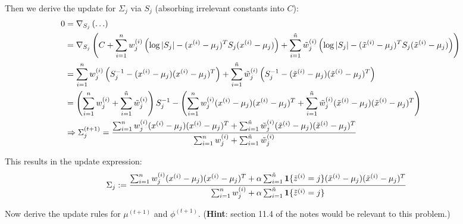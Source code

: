 Then we derive the update for $\Sigma_j$ via $S_j$ (absorbing irrelevant constants into $C$):
\begin{align*}
0 &= \nabla_{S_j} \left(\ldots\right) \\
&= \nabla_{S_j} \left(C + \sum_{i=1}^{n} w^{(i)}_j\left(\log |S_j| - (x^{(i)}-\mu_j)^TS_j(x^{(i)}-\mu_j)\right) + \sum_{i=1}^{\tilde{{n}}} \tilde{w}^{(i)}_j\left(\log |S_j| - (\tilde{x}^{(i)}-\mu_j)^TS_j(\tilde{x}^{(i)}-\mu_j)\right)\right) \\
&= \sum_{i=1}^{n} w^{(i)}_j\left(S_j^{-1} - (x^{(i)}-\mu_j)(x^{(i)}-\mu_j)^T\right) + \sum_{i=1}^{\tilde{{n}}} \tilde{w}^{(i)}_j\left(S_j^{-1} - (\tilde{x}^{(i)}-\mu_j)(\tilde{x}^{(i)}-\mu_j)^T\right) \\
&= \left(\sum_{i=1}^{n} w^{(i)}_j + \sum_{i=1}^{\tilde{{n}}} \tilde{w}^{(i)}_j\right) S_j^{-1} - \left(\sum_{i=1}^{n} w_{j}^{(i)}(x^{(i)}-\mu_j)(x^{(i)}-\mu_j)^T + \sum_{i=1}^{\tilde{{n}}} \tilde{w}^{(i)}_j(\tilde{x}^{(i)} - \mu_j)(\tilde{x}^{(i)}-\mu_j)^T\right) \\
&\Rightarrow \Sigma_j^{(t+1)} = \frac{\sum_{i=1}^{n} w_{j}^{(i)}(x^{(i)}-\mu_j)(x^{(i)}-\mu_j)^T + \sum_{i=1}^{\tilde{{n}}} \tilde{w}^{(i)}_j(\tilde{x}^{(i)} - \mu_j)(\tilde{x}^{(i)}-\mu_j)^T}{\sum_{i=1}^{n} w^{(i)}_j + \sum_{i=1}^{\tilde{{n}}} \tilde{w}^{(i)}_j}
\end{align*}

This results in the update expression:
\begin{align*}
  \Sigma_j & := \frac{ \sum_{i=1}^{n} w^{(i)}_j(x^{(i)}-\mu_j)(x^{(i)}-\mu_j)^T + \alpha\sum_{i=1}^{\tilde{{n}}} \textbf{1}\{\tilde{z}^{(i)} = j\}(\tilde{x}^{(i)}-\mu_j)(\tilde{x}^{(i)}-\mu_j)^T} {\sum_{i=1}^{n} w^{(i)}_j + \alpha\sum_{i=1}^{\tilde{{n}}} \textbf{1}\{\tilde{z}^{(i)} = j\} }
\end{align*}

Now derive the update rules for $\mu^{(t+1)}$ and $\phi^{(t+1)}$. (\textbf{Hint}: section 11.4 of the notes would be relevant to this problem.)


